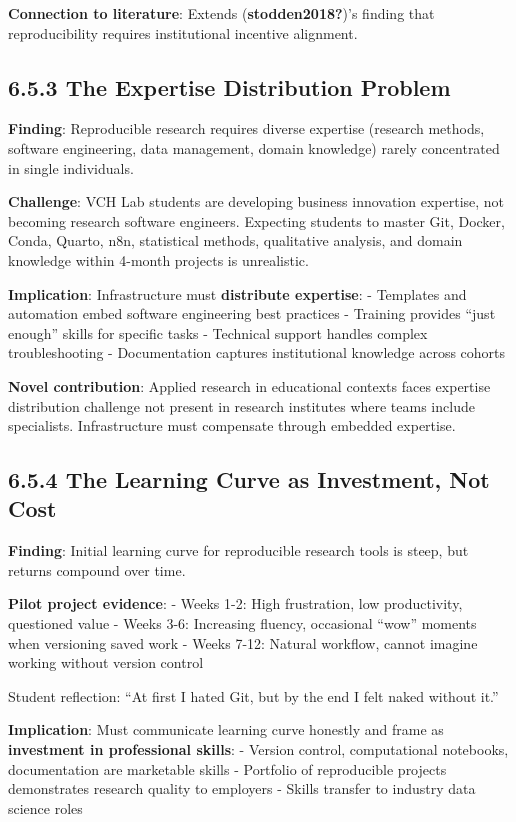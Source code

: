 \documentclass[
  oneside,
  open=any]{scrbook}
\begin{document}
\textbf{Connection to literature}: Extends (\textbf{stodden2018?})'s
finding that reproducibility requires institutional incentive alignment.

\subsection{6.5.3 The Expertise Distribution
Problem}\label{the-expertise-distribution-problem}

\textbf{Finding}: Reproducible research requires diverse expertise
(research methods, software engineering, data management, domain
knowledge) rarely concentrated in single individuals.

\textbf{Challenge}: VCH Lab students are developing business innovation
expertise, not becoming research software engineers. Expecting students
to master Git, Docker, Conda, Quarto, n8n, statistical methods,
qualitative analysis, and domain knowledge within 4-month projects is
unrealistic.

\textbf{Implication}: Infrastructure must \textbf{distribute expertise}:
- Templates and automation embed software engineering best practices -
Training provides ``just enough'' skills for specific tasks - Technical
support handles complex troubleshooting - Documentation captures
institutional knowledge across cohorts

\textbf{Novel contribution}: Applied research in educational contexts
faces expertise distribution challenge not present in research
institutes where teams include specialists. Infrastructure must
compensate through embedded expertise.

\subsection{6.5.4 The Learning Curve as Investment, Not
Cost}\label{the-learning-curve-as-investment-not-cost}

\textbf{Finding}: Initial learning curve for reproducible research tools
is steep, but returns compound over time.

\textbf{Pilot project evidence}: - Weeks 1-2: High frustration, low
productivity, questioned value - Weeks 3-6: Increasing fluency,
occasional ``wow'' moments when versioning saved work - Weeks 7-12:
Natural workflow, cannot imagine working without version control

Student reflection: ``At first I hated Git, but by the end I felt naked
without it.''

\textbf{Implication}: Must communicate learning curve honestly and frame
as \textbf{investment in professional skills}: - Version control,
computational notebooks, documentation are marketable skills - Portfolio
of reproducible projects demonstrates research quality to employers -
Skills transfer to industry data science roles
\end{document}
